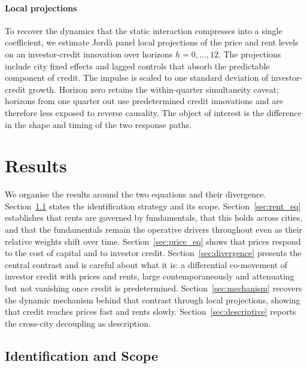\documentclass[preprint,11pt,authoryear]{elsarticle}
\begin{document}
\paragraph{Local projections}

To recover the dynamics that the static interaction compresses into a
single coefficient, we estimate Jord\`{a} panel local projections of the
price and rent levels on an investor-credit innovation over horizons
$h=0,\dots,12$. The projections include city fixed effects and lagged
controls that absorb the predictable component of credit. The impulse is
scaled to one standard deviation of investor-credit growth. Horizon zero
retains the within-quarter simultaneity caveat; horizons from one quarter
out use predetermined credit innovations and are therefore less exposed
to reverse causality. The object of interest is the difference in the
shape and timing of the two response paths.

\section{Results}
\label{sec:results}

We organise the results around the two equations and their divergence.
Section~\ref{sec:identification} states the identification strategy and
its scope. Section~\ref{sec:rent_eq} establishes that rents are
governed by fundamentals, that this holds across cities, and that the
fundamentals remain the operative drivers throughout even as their
relative weights shift over time.
Section~\ref{sec:price_eq} shows that prices respond to the cost of
capital and to investor credit. Section~\ref{sec:divergence} presents
the central contrast and is careful about what it is: a differential
co-movement of investor credit with prices and rents, large
contemporaneously and attenuating but not vanishing once credit is
predetermined. Section~\ref{sec:mechanism} recovers the dynamic
mechanism behind that contrast through local projections, showing that
credit reaches prices fast and rents slowly. Section~\ref{sec:descriptive}
reports the cross-city decoupling as description.

\subsection{Identification and Scope}
\label{sec:identification}
\end{document}
